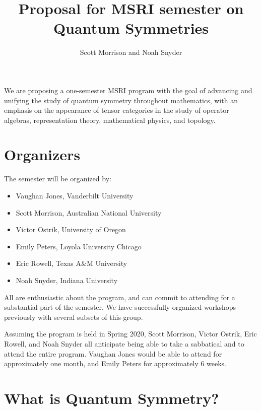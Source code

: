 \documentclass[12pt]{article}
\title{Proposal for MSRI semester on \textbf{Quantum Symmetries}}
\author{Scott Morrison and Noah Snyder}
\begin{document}
\maketitle



We are proposing a one-semester MSRI program with the goal of advancing and unifying the study of quantum symmetry throughout mathematics, with an emphasis on the appearance of tensor categories in the study of operator algebras, representation theory, mathematical physics, and topology.

\section{Organizers}
The semester will be organized by:
\begin{itemize}
  \setlength{\itemsep}{1pt}
  \setlength{\parskip}{0pt}
  \setlength{\parsep}{0pt}
\item Vaughan Jones, Vanderbilt University
\item Scott Morrison, Australian National University
\item Victor Ostrik, University of Oregon
\item Emily Peters, Loyola University Chicago
\item Eric Rowell, Texas A\&M University
\item Noah Snyder, Indiana University
\end{itemize}
All are enthusiastic about the program, and can commit to attending for a substantial part of the semester. We have successfully organized workshops previously with several subsets of this group.

Assuming the program is held in Spring 2020, Scott Morrison, Victor Ostrik, Eric Rowell, and  Noah Snyder all anticipate being able to take a sabbatical and to attend the entire program. Vaughan Jones would be able to attend for approximately one month, and Emily Peters for approximately 6 weeks.


\section{What is Quantum Symmetry?}
\end{document}
